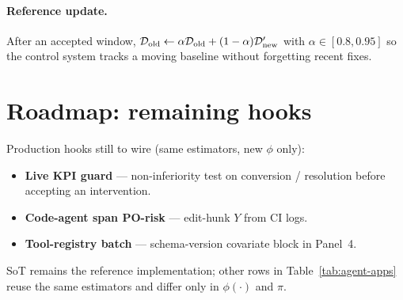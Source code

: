 \paragraph{Reference update.} After an accepted window, $\mathcal{D}_{\mathrm{old}} \leftarrow
\alpha \mathcal{D}_{\mathrm{old}} + (1-\alpha)\mathcal{D}_{\mathrm{new}}'$ with $\alpha\in[0.8,0.95]$ so the control
system tracks a moving baseline without forgetting recent fixes.

\section{Roadmap: remaining hooks}
\label{sec:roadmap}

Production hooks still to wire (same estimators, new $\phi$ only):
\begin{itemize}[leftmargin=*]
  \item \textbf{Live KPI guard} --- non-inferiority test on conversion / resolution
  before accepting an intervention.
  \item \textbf{Code-agent span PO-risk} --- edit-hunk $Y$ from CI logs.
  \item \textbf{Tool-registry batch} --- schema-version covariate block in Panel~4.
\end{itemize}
SoT remains the reference implementation; other rows in
Table~\ref{tab:agent-apps} reuse the same estimators and differ only in
$\phi(\cdot)$ and $\pi$.
